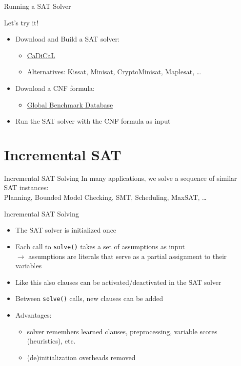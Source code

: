 \documentclass[t]{sdqbeamer}
\begin{document}
\begin{frame}{Running a SAT Solver}
\begin{alert}{Let's try it!}
	\begin{itemize}\setlength{\itemsep}{1em}
		\item Download and Build a SAT solver:
			\begin{itemize}
				\item \href{https://github.com/arminbiere/cadical}{CaDiCaL}
				\item Alternatives: \href{https://github.com/arminbiere/kissat}{Kissat}, \href{https://github.com/niklasso/minisat}{Minisat}, \href{https://github.com/msoos/cryptominisat}{CryptoMinisat}, \href{https://maplesat.github.io/}{Maplesat}, \dots
			\end{itemize}
		\item Download a CNF formula:
			\begin{itemize}
				\item \href{https://benchmark-database.de}{Global Benchmark Database}
			\end{itemize}
		\item Run the SAT solver with the CNF formula as input
	\end{itemize}
\end{alert}
\end{frame}


\section{Incremental SAT}

\begin{frame}{Incremental SAT Solving}
In many applications, we solve a sequence of similar SAT instances:\\[1ex]
Planning, Bounded Model Checking, SMT, Scheduling, MaxSAT, \dots

\begin{block}{Incremental SAT Solving}
\begin{itemize}\setlength{\itemsep}{1em}
	\item The SAT solver is initialized once
	\item Each call to \texttt{solve()} takes a set of assumptions as input\\
		  $\rightarrow$ assumptions are literals that serve as a partial assignment to their variables
	\item Like this also clauses can be activated/deactivated in the SAT solver
	\item Between \texttt{solve()} calls, new clauses can be added
	\item Advantages:
	\begin{itemize}
		\item<2-> solver remembers learned clauses, preprocessing, variable scores (heuristics), etc.
		\item<2-> (de)initialization overheads removed
	\end{itemize}
\end{itemize}
\end{block}
\end{frame}
\end{document}
